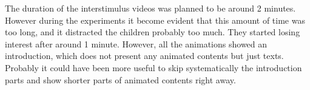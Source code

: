 The duration of the interstimulus videos was planned to be around 2 minutes. However during the experiments it become evident that this amount of time was too long, and it distracted the children probably too much. They started losing interest after around 1 minute. However, all the animations showed an introduction, which does not present any animated contents but just texts. Probably it could have been more useful to skip systematically the introduction parts and show shorter parts of animated contents right away.
